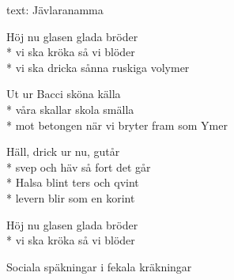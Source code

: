 \begin{SongText}
    \begin{SongInfo}
        text: Jävlaranamma
    \end{SongInfo}
    \begin{SongVerse}
        Höj nu glasen glada bröder\\*%
        vi ska kröka så vi blöder\\*%
        vi ska dricka sånna ruskiga volymer
    \end{SongVerse}
    \begin{SongVerse}
        Ut ur Bacci sköna källa\\*%
        våra skallar skola smälla\\*%
        mot betongen när vi bryter fram som Ymer
    \end{SongVerse}
    \begin{SongVerse}
        Häll, drick ur nu, gutår\\*%
        svep och häv så fort det går\\*%
        Halsa blint ters och qvint\\*%
        levern blir som en korint
    \end{SongVerse}
    \begin{SongVerse}
        Höj nu glasen glada bröder\\*%
        vi ska kröka så vi blöder
    \end{SongVerse}
    \begin{SongVerse}
        Sociala späkningar i fekala kräkningar

    \end{SongVerse}
\end{SongText}
